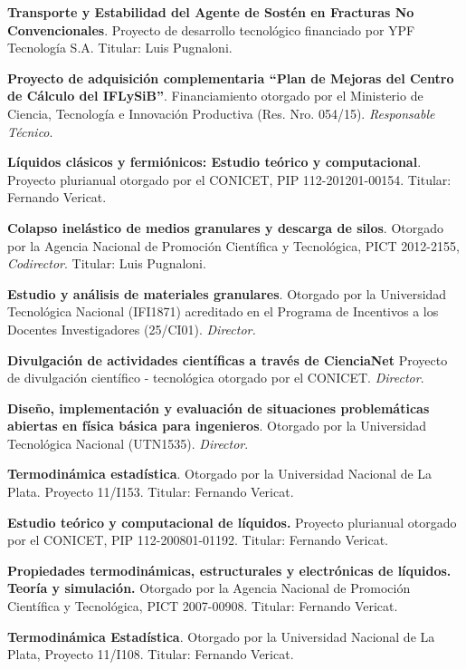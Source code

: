  \textbf{Transporte y Estabilidad del Agente de Sostén en Fracturas No Convencionales}. Proyecto de desarrollo tecnológico financiado por YPF Tecnología S.A. Titular: Luis Pugnaloni.

 \textbf{Proyecto de adquisición complementaria ``Plan de Mejoras del Centro de Cálculo del IFLySiB''}. Financiamiento otorgado por el Ministerio de Ciencia, Tecnología e Innovación Productiva (Res. Nro. 054/15). \textit{Responsable Técnico}.

  \textbf{Líquidos clásicos y fermiónicos: Estudio teórico y computacional}. Proyecto plurianual otorgado por el CONICET, PIP 112-201201-00154. Titular: Fernando Vericat.

 \textbf{Colapso inelástico de medios granulares y descarga de silos}. Otorgado por la Agencia Nacional de Promoción Científica y Tecnológica, PICT 2012-2155, \textit{Codirector}. Titular: Luis Pugnaloni.

 \textbf{Estudio y análisis de materiales granulares}. Otorgado por la Universidad Tecnológica Nacional (IFI1871) acreditado en el Programa de Incentivos a los Docentes Investigadores (25/CI01). \textit{Director.}

 \textbf{Divulgación de actividades científicas a través de CienciaNet} Proyecto de divulgación científico - tecnológica otorgado por el CONICET. \textit{Director}.

 \textbf{Diseño, implementación y evaluación de situaciones problemáticas abiertas en física básica para ingenieros}. Otorgado por la Universidad Tecnológica Nacional (UTN1535). \textit{Director}.

 \textbf{Termodinámica estadística}. Otorgado por la Universidad Nacional de La Plata. Proyecto 11/I153. Titular: Fernando Vericat. 

 \textbf{Estudio teórico y computacional de líquidos.} Proyecto plurianual otorgado por el CONICET, PIP  112-200801-01192. Titular: Fernando Vericat.

 \textbf{Propiedades termodinámicas, estructurales y electrónicas de líquidos. Teoría y simulación.} Otorgado por la Agencia Nacional de Promoción Científica y Tecnológica, PICT 2007-00908. Titular: Fernando Vericat.

 \textbf{Termodinámica Estadística}. Otorgado por la Universidad Nacional de La Plata, Proyecto 11/I108. Titular: Fernando Vericat.

